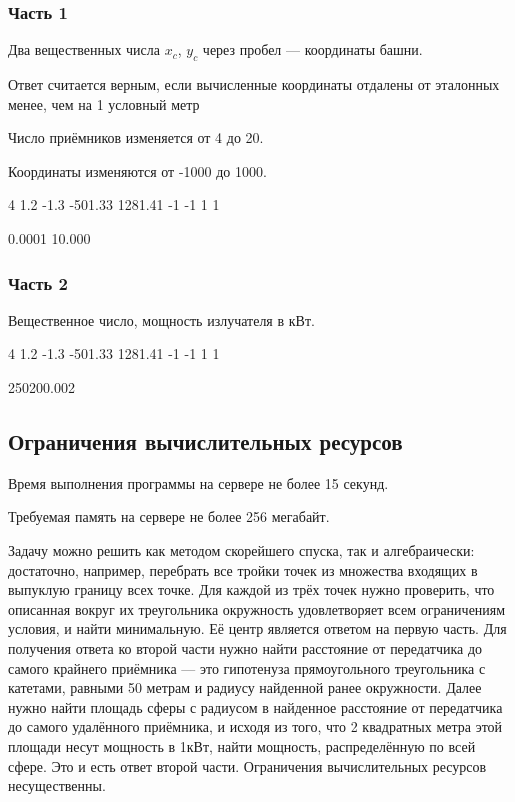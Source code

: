 \outputfmtSection

\subsubsection*{Часть 1}

Два вещественных числа $x_c$, $y_c$ через пробел — координаты башни.

Ответ считается верным, если вычисленные координаты отдалены от эталонных менее, чем на 1 условный метр

Число приёмников изменяется от 4 до 20.

Координаты изменяются от -1000 до 1000.

\begin{myverbbox}[\small]{\vinput}
    4
    1.2 -1.3
    -501.33 1281.41
    -1 -1
    1 1
\end{myverbbox}
\begin{myverbbox}[\small]{\voutput}
    0.0001 10.000
\end{myverbbox}

\subsubsection*{Часть 2} 

Вещественное число, мощность излучателя в кВт.

\begin{myverbbox}[\small]{\vinput}
    4
    1.2 -1.3
    -501.33 1281.41
    -1 -1
    1 1
\end{myverbbox}
\begin{myverbbox}[\small]{\voutput}
    250200.002
\end{myverbbox}

\subsection*{Ограничения вычислительных ресурсов}

Время выполнения программы на сервере не более 15 секунд.

Требуемая память на сервере не более 256 мегабайт.


\solutionSection

Задачу можно решить как методом скорейшего спуска, так и алгебраически: достаточно, например, перебрать все тройки точек из множества входящих в выпуклую границу всех точке. Для каждой из трёх точек нужно проверить, что описанная вокруг их треугольника окружность удовлетворяет всем ограничениям условия, и найти минимальную. Её центр является ответом на первую часть. Для получения ответа ко второй части нужно найти расстояние от передатчика до самого крайнего приёмника — это гипотенуза прямоугольного треугольника с катетами, равными 50 метрам и радиусу найденной ранее окружности. Далее нужно найти площадь сферы с радиусом в найденное расстояние от передатчика до самого удалённого приёмника, и исходя из того, что 2 квадратных метра этой площади несут мощность в 1кВт, найти мощность, распределённую по всей сфере. Это и есть ответ второй части. Ограничения вычислительных ресурсов несущественны.

